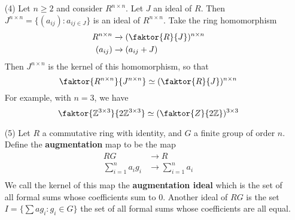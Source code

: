 \begin{example}
\begin{enumerate}
    \item[(4)] Let $n \geq 2$ and consider  $R^{n \times n}$. Let $J$ an ideal
        of  $R$. Then  $J^{n \times n}=\{(a_{ij}) : a_{ij \in J}\}$ is an ideal
        of $R^{n \times n}$. Take the ring homomorphism
        \begin{align*}
            R^{n \times n}  & \xrightarrow{} (\faktor{R}{J})^{n \times n}   \\
            (a_{ij})    & \xrightarrow{} (a_{ij}+J) \\
        \end{align*}
        Then $J^{n \times n}$ is the kernel of this homomorphism, so that
        \begin{equation*}
            \faktor{R^{n \times n}}{J^{n \times n}} \simeq (\faktor{R}{J})^{n \times n}
        \end{equation*}
        For example, with $n=3$, we have
        \begin{equation*}
            \faktor{\Z^{3 \times 3}}{2\Z^{3 \times 3}} \simeq
            (\faktor{Z}{2\Z})^{3 \times 3}
        \end{equation*}

    \item[(5)] Let $R$ a commutative ring with identity, and  $G$ a finite group
        of order $n$. Define the  \textbf{augmentation} map to be the map
        \begin{align*}
            RG      & \xrightarrow{}    R   \\
            \sum_{i=1}^n{a_ig_i}    & \xrightarrow{} \sum_{i=1}^n{a_i}  \\
        \end{align*}
        We call the kernel of this map the \textbf{augmentation ideal} which is
        the set of all formal sums whose coefficients sum to $0$. Another ideal
        of  $RG$ is the set $I=\{\sum{ag_i} : g_i \in G\}$ the set of all formal
        sums whose coefficients are all equal.
    \end{enumerate}
\end{example}

